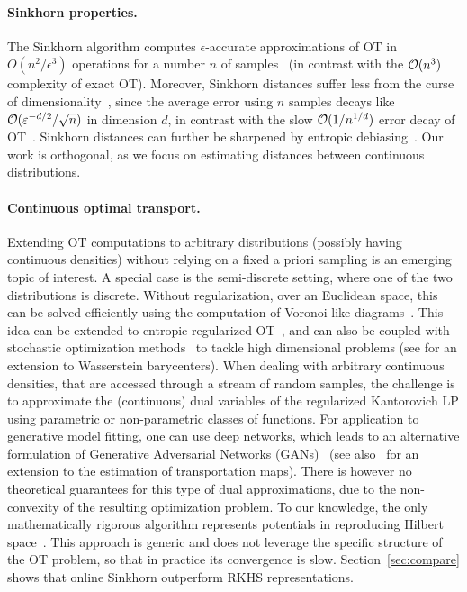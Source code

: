 \paragraph{Sinkhorn properties.} The Sinkhorn algorithm computes $\epsilon$-accurate
approximations of OT in $O(n^2/\epsilon^3)$ operations for a number $n$ of
samples~\citep{altschuler2017near} (in contrast with the $\mathcal{O}(n^3)$ complexity of exact OT). Moreover, Sinkhorn distances suffer less from the
curse of dimensionality~\citep{2019-Genevay-aistats}, since the average error
using $n$ samples decays like $\mathcal{O}(\varepsilon^{-d/2}/\sqrt{n})$ in dimension
$d$, in contrast with the slow $\mathcal{O}(1/n^{1/d})$ error decay of
OT~\citep{dudley_speed_1969,weed2019sharp}. Sinkhorn distances can further be sharpened
by entropic debiasing~\citep{2019-Feydy-aistats}. Our work is orthogonal, as we focus on estimating distances between continuous distributions.

\paragraph{Continuous optimal transport.} Extending OT computations to arbitrary
distributions (possibly having continuous densities) without relying on a fixed
a priori sampling is an emerging topic of interest. A special case is the
semi-discrete setting, where one of the two distributions is discrete. Without
regularization, over an Euclidean space, this can be solved efficiently using
the computation of Voronoi-like diagrams~\citep{merigot2011multiscale}. This
idea can be extended to entropic-regularized OT~\citep{cuturi2018semidual}, and
can also be coupled with stochastic optimization
methods~\citep{2016-genevay-nips} to tackle high dimensional problems (see
 \cite{staib2017parallel} for an extension to Wasserstein barycenters). When dealing with arbitrary continuous densities, that are accessed through a
stream of random samples, the challenge is to approximate  the (continuous) dual
variables of the regularized Kantorovich LP using parametric or non-parametric
classes of functions. For application to generative model fitting, one can use
deep networks, which leads to an alternative formulation of Generative
Adversarial Networks (GANs)~\citep{arjovsky2017wgan} (see
also~\citet{seguy2018large} for an extension to the estimation of transportation
maps). There is however no theoretical guarantees for this type of dual
approximations, due to the non-convexity of the resulting optimization problem.
To our knowledge, the only mathematically rigorous algorithm represents potentials in reproducing
Hilbert space~\citep{2016-genevay-nips}. This
approach is generic and does not leverage the specific structure of the OT problem, so that in practice its convergence is slow. Section~\autoref{sec:compare} shows that online Sinkhorn outperform RKHS representations.

